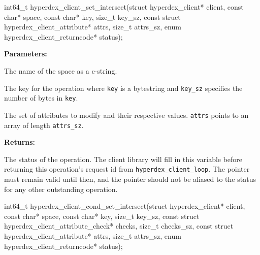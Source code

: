 \funcsep
{}
\begin{ccode}
int64_t hyperdex_client_set_intersect(struct hyperdex_client* client,
                const char* space,
                const char* key, size_t key_sz,
                const struct hyperdex_client_attribute* attrs, size_t attrs_sz,
                enum hyperdex_client_returncode* status);
\end{ccode}
\funcdesc 

\noindent\textbf{Parameters:}
\begin{description}[labelindent=\widthof{{\texttt{attrs}, \texttt{attrs\_sz}}},leftmargin=*,noitemsep,nolistsep,align=right]
\item[\texttt{space}] The name of the space as a c-string.
\item[\texttt{key}, \texttt{key\_sz}] The key for the operation where \texttt{key} is a bytestring and \texttt{key\_sz} specifies the number of bytes in \texttt{key}.
\item[\texttt{attrs}, \texttt{attrs\_sz}] The set of attributes to modify and their respective values.  \texttt{attrs} points to an array of length \texttt{attrs\_sz}.
\end{description}

\noindent\textbf{Returns:}
\begin{description}[labelindent=\widthof{{\texttt{status}}},leftmargin=*,noitemsep,nolistsep,align=right]
\item[\texttt{status}] The status of the operation.  The client library will fill in this variable before returning this operation's request id from \texttt{hyperdex\_client\_loop}.  The pointer must remain valid until then, and the pointer should not be aliased to the status for any other outstanding operation.
\end{description}

\funcsep
{}
\begin{ccode}
int64_t hyperdex_client_cond_set_intersect(struct hyperdex_client* client,
                const char* space,
                const char* key, size_t key_sz,
                const struct hyperdex_client_attribute_check* checks, size_t checks_sz,
                const struct hyperdex_client_attribute* attrs, size_t attrs_sz,
                enum hyperdex_client_returncode* status);
\end{ccode}
\funcdesc 

